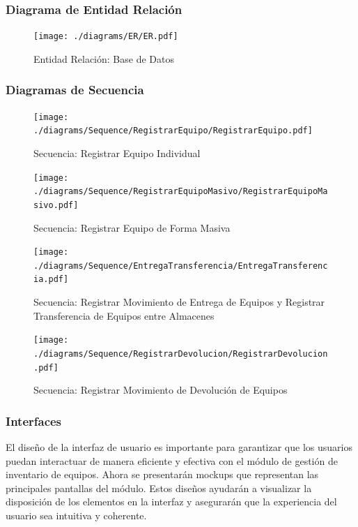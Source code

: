 \documentclass[stu, 12pt, letterpaper, donotrepeattitle, floatsintext, natbib]{apa7}
\begin{document}
\subsubsection{Diagrama de Entidad Relación}
\begin{figure}[H]
    \centering
    \caption{Entidad Relación: Base de Datos}
    \texttt{[image: ./diagrams/ER/ER.pdf]}
\end{figure}
\subsubsection{Diagramas de Secuencia}
\begin{figure}[H]
    \centering
    \caption{Secuencia: Registrar Equipo Individual}
    \texttt{[image: ./diagrams/Sequence/RegistrarEquipo/RegistrarEquipo.pdf]}
\end{figure}
\begin{figure}[H]
    \centering
    \caption{Secuencia: Registrar Equipo de Forma Masiva}
    \texttt{[image: ./diagrams/Sequence/RegistrarEquipoMasivo/RegistrarEquipoMasivo.pdf]}
\end{figure}
\begin{figure}[H]
    \centering
    \caption{Secuencia: Registrar Movimiento de Entrega de Equipos y Registrar Transferencia de Equipos entre Almacenes}
    \texttt{[image: ./diagrams/Sequence/EntregaTransferencia/EntregaTransferencia.pdf]}
\end{figure}
\begin{figure}[H]
    \centering
    \caption{Secuencia: Registrar Movimiento de Devolución de Equipos}
    \texttt{[image: ./diagrams/Sequence/RegistrarDevolucion/RegistrarDevolucion.pdf]}
\end{figure}
\subsubsection{Interfaces}
El diseño de la interfaz de usuario es importante para garantizar que los usuarios puedan interactuar de manera eficiente y efectiva con el
módulo de gestión de inventario de equipos. Ahora se presentarán mockups que representan las principales pantallas del módulo. Estos diseños
ayudarán a visualizar la disposición de los elementos en la interfaz y asegurarán que la experiencia del usuario sea intuitiva y coherente.
\end{document}
